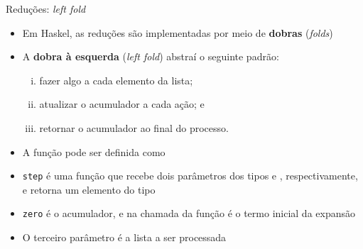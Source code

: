 \begin{frame}[fragile]{Reduções: {\it left fold}}

    \begin{itemize}
        \item Em Haskel, as reduções são implementadas por meio de \textbf{dobras} (\textit{folds})

        \item A \textbf{dobra à esquerda} (\textit{left fold}) abstraí o seguinte padrão:
        \begin{enumerate}[i.]
            \item fazer algo a cada elemento da lista;
            \item atualizar o acumulador a cada ação; e
            \item retornar o acumulador ao final do processo.
        \end{enumerate}

        \item A função  pode ser definida como


        \item \texttt{step} é uma função que recebe dois parâmetros dos tipos 
             e , respectivamente, e retorna um elemento do
            tipo 

        \item \texttt{zero} é o acumulador, e na chamada da função 
            é o termo inicial da expansão

        \item O terceiro parâmetro é a lista a ser processada
    \end{itemize}

\end{frame}

